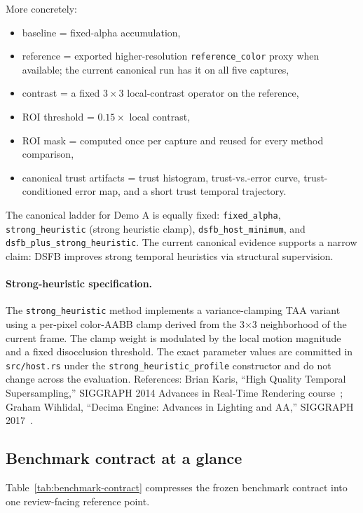 \documentclass[11pt]{article}
\theoremstyle{definition}
\theoremstyle{plain}
\begin{document}
More concretely:
\begin{itemize}[leftmargin=1.5em]
    \item baseline = fixed-alpha accumulation,
    \item reference = exported higher-resolution \texttt{reference\_color} proxy when available; the current canonical run has it on all five captures,
    \item contrast = a fixed 3\,$\times$\,3 local-contrast operator on the reference,
    \item ROI threshold = $0.15 \times$ local contrast,
    \item ROI mask = computed once per capture and reused for every method comparison,
    \item canonical trust artifacts = trust histogram, trust-vs.-error curve, trust-conditioned error map, and a short trust temporal trajectory.
\end{itemize}

The canonical ladder for Demo A is equally fixed: \texttt{fixed\_alpha}, \texttt{strong\_heuristic} (strong heuristic clamp), \texttt{dsfb\_host\_minimum}, and \texttt{dsfb\_plus\_strong\_heuristic}.
The current canonical evidence supports a narrow claim: DSFB improves strong temporal heuristics via structural supervision.

\paragraph{Strong-heuristic specification.}
The \texttt{strong\_heuristic} method implements a variance-clamping TAA variant using a per-pixel color-AABB clamp derived from the 3$\times$3 neighborhood of the current frame. The clamp weight is modulated by the local motion magnitude and a fixed disocclusion threshold. The exact parameter values are committed in \texttt{src/host.rs} under the \texttt{strong\_heuristic\_profile} constructor and do not change across the evaluation. References: Brian Karis, ``High Quality Temporal Supersampling,'' SIGGRAPH 2014 Advances in Real-Time Rendering course~\cite{karis2014}; Graham Wihlidal, ``Decima Engine: Advances in Lighting and AA,'' SIGGRAPH 2017~\cite{wihlidal2017}.

\subsection{Benchmark contract at a glance}

Table~\ref{tab:benchmark-contract} compresses the frozen benchmark contract into one review-facing reference point.
\end{document}
